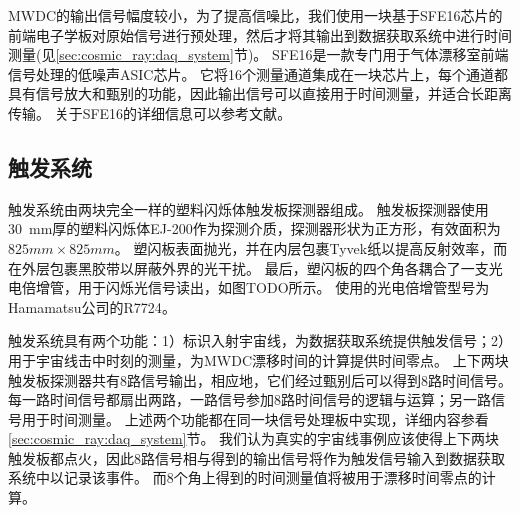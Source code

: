 MWDC的输出信号幅度较小，为了提高信噪比，我们使用一块基于SFE16芯片的前端电子学板对原始信号进行预处理，然后才将其输出到数据获取系统中进行时间测量(见\ref{sec:cosmic_ray:daq_system}节)。
SFE16是一款专门用于气体漂移室前端信号处理的低噪声ASIC芯片。
它将16个测量通道集成在一块芯片上，每个通道都具有信号放大和甄别的功能，因此输出信号可以直接用于时间测量，并适合长距离传输。
关于SFE16的详细信息可以参考文献\parencite{sfe16}。

\subsection{触发系统}
\label{sec:cosmic_ray:triggering_system}
触发系统由两块完全一样的塑料闪烁体触发板探测器组成。
触发板探测器使用\SI{30}{mm}厚的塑料闪烁体EJ-200\parencite{ej-200}作为探测介质，探测器形状为正方形，有效面积为$825mm \times 825mm$。
塑闪板表面抛光，并在内层包裹Tyvek纸以提高反射效率，而在外层包裹黑胶带以屏蔽外界的光干扰。
最后，塑闪板的四个角各耦合了一支光电倍增管，用于闪烁光信号读出，如图TODO所示。
使用的光电倍增管型号为Hamamatsu公司的R7724\parencite{r7724}。

触发系统具有两个功能：1）标识入射宇宙线，为数据获取系统提供触发信号；2）用于宇宙线击中时刻的测量，为MWDC漂移时间的计算提供时间零点。
上下两块触发板探测器共有8路信号输出，相应地，它们经过甄别后可以得到8路时间信号。
每一路时间信号都扇出两路，一路信号参加8路时间信号的逻辑与运算；另一路信号用于时间测量。
上述两个功能都在同一块信号处理板中实现，详细内容参看\ref{sec:cosmic_ray:daq_system}节。
我们认为真实的宇宙线事例应该使得上下两块触发板都点火，因此8路信号相与得到的输出信号将作为触发信号输入到数据获取系统中以记录该事件。
而8个角上得到的时间测量值将被用于漂移时间零点的计算。

